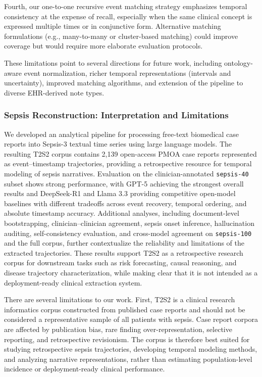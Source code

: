 Fourth, our one-to-one recursive event matching strategy emphasizes temporal consistency at the expense of recall, especially when the same clinical concept is expressed multiple times or in conjunctive form.
Alternative matching formulations (e.g., many-to-many or cluster-based matching) could improve coverage but would require more elaborate evaluation protocols.

These limitations point to several directions for future work, including ontology-aware event normalization, richer temporal representations (intervals and uncertainty), improved matching algorithms, and extension of the pipeline to diverse EHR-derived note types.

\subsubsection{Sepsis Reconstruction: Interpretation and Limitations}

We developed an analytical pipeline for processing free-text biomedical case reports into Sepsis-3 textual time series using large language models.
The resulting T2S2 corpus contains 2,139 open-access PMOA case reports represented as event--timestamp trajectories, providing a retrospective resource for temporal modeling of sepsis narratives.
Evaluation on the clinician-annotated \texttt{sepsis-40} subset shows strong performance, with GPT-5 achieving the strongest overall results and DeepSeek-R1 and Llama 3.3 providing competitive open-model baselines with different tradeoffs across event recovery, temporal ordering, and absolute timestamp accuracy.
Additional analyses, including document-level bootstrapping, clinician--clinician agreement, sepsis onset inference, hallucination auditing, self-consistency evaluation, and cross-model agreement on \texttt{sepsis-100} and the full corpus, further contextualize the reliability and limitations of the extracted trajectories.
These results support T2S2 as a retrospective research corpus for downstream tasks such as risk forecasting, causal reasoning, and disease trajectory characterization, while making clear that it is not intended as a deployment-ready clinical extraction system.


There are several limitations to our work.
First, T2S2 is a clinical research informatics corpus constructed from published case reports and should not be considered a representative sample of all patients with sepsis.
Case report corpora are affected by publication bias, rare finding over-representation, selective reporting, and retrospective revisionism.
The corpus is therefore best suited for studying retrospective sepsis trajectories, developing temporal modeling methods, and analyzing narrative representations, rather than estimating population-level incidence or deployment-ready clinical performance.

